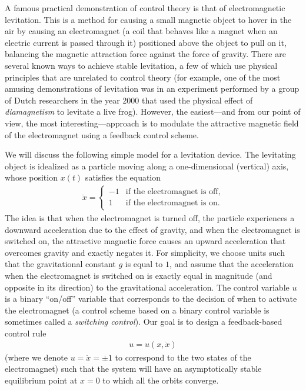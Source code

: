 \documentclass[12pt]{amsart}
\newcommand{\eqst}[1]{\begin{align*}#1\end{align*}}
\newcounter{example}
\begin{document}
A famous practical demonstration of control theory is that of electromagnetic levitation. This is a method for causing a small magnetic object to hover in the air by causing an electromagnet (a coil that behaves like a magnet when an electric current is passed through it) positioned above the object to pull on it, balancing the magnetic attraction force against the force of gravity. There are several known ways to achieve stable levitation, a few of which use physical principles that are unrelated to control theory (for example, one of the most amusing demonstrations of levitation was in an experiment performed by a group of Dutch researchers in the year 2000 that used the physical effect of \emph{diamagnetism} to levitate a live frog). However, the easiest---and from our point of view, the most interesting---approach is to modulate the attractive magnetic field of the electromagnet using a feedback control scheme.

We will discuss the following simple model for a levitation device. The levitating object is idealized as a particle moving along a one-dimensional (vertical) axis, whose position $x(t)$ satisfies the equation
\eqst{
\ddot{x} = \begin{cases} -1 & \textrm{if the electromagnet is off}, \\
1 & \textrm{if the electromagnet is on.}
\end{cases}
}
The idea is that when the electromagnet is turned off, the particle experiences a downward acceleration due to the effect of gravity, and when the electromagnet is switched on, the attractive magnetic force causes an upward acceleration that overcomes gravity and exactly negates it. For simplicity, we choose units such that the gravitational constant $g$ is equal to $1$, and assume that the acceleration when the electromagnet is switched on is exactly equal in magnitude (and opposite in its direction) to the gravitational acceleration. The control variable $u$ is a binary ``on/off'' variable that corresponds to the decision of when to activate the electromagnet (a control scheme based on a binary control variable is sometimes called a \emph{switching control}). Our goal is to design a feedback-based control rule
\eqst{ u = u(x, \dot{x}) }
(where we denote $u=\ddot{x}=\pm 1$ to correspond to the two states of the electromagnet) such that the system will have an asymptotically stable equilibrium point at $x=0$ to which all the orbits converge.
\end{document}
